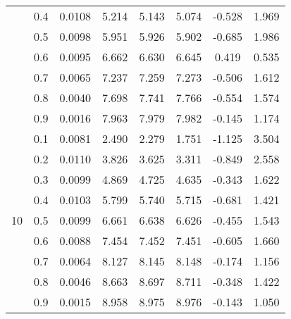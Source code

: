 \documentclass[11pt,a4paper]{report}
\begin{document}
\begin{longtable}{ | c | c || c | c | c | c | c | c | }
 & 0.4 & 0.0108 & 5.214 & 5.143 & 5.074 & -0.528 & 1.969 \\
 & 0.5 & 0.0098 & 5.951 & 5.926 & 5.902 & -0.685 & 1.986 \\
 & 0.6 & 0.0095 & 6.662 & 6.630 & 6.645 & 0.419 & 0.535 \\
 & 0.7 & 0.0065 & 7.237 & 7.259 & 7.273 & -0.506 & 1.612 \\
 & 0.8 & 0.0040 & 7.698 & 7.741 & 7.766 & -0.554 & 1.574 \\
 & 0.9 & 0.0016 & 7.963 & 7.979 & 7.982 & -0.145 & 1.174 \\
 \hline
\multirow{9}{*}{10} & 0.1 & 0.0081 & 2.490 & 2.279 & 1.751 & -1.125 & 3.504 \\
 & 0.2 & 0.0110 & 3.826 & 3.625 & 3.311 & -0.849 & 2.558 \\
 & 0.3 & 0.0099 & 4.869 & 4.725 & 4.635 & -0.343 & 1.622 \\
 & 0.4 & 0.0103 & 5.799 & 5.740 & 5.715 & -0.681 & 1.421 \\
 & 0.5 & 0.0099 & 6.661 & 6.638 & 6.626 & -0.455 & 1.543 \\
 & 0.6 & 0.0088 & 7.454 & 7.452 & 7.451 & -0.605 & 1.660 \\
 & 0.7 & 0.0064 & 8.127 & 8.145 & 8.148 & -0.174 & 1.156 \\
 & 0.8 & 0.0046 & 8.663 & 8.697 & 8.711 & -0.348 & 1.422 \\
 & 0.9 & 0.0015 & 8.958 & 8.975 & 8.976 & -0.143 & 1.050 \\
 \hline
\hline
\end{longtable}
\end{document}
